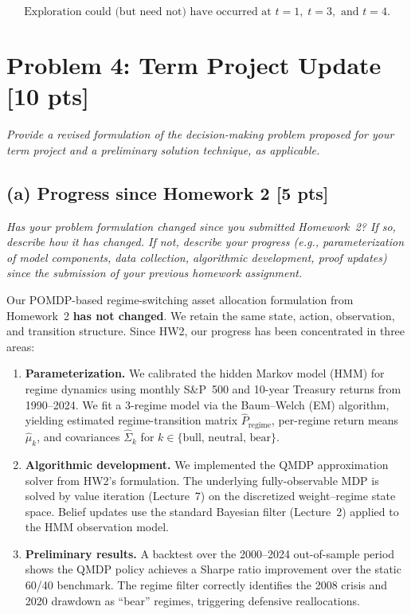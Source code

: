\documentclass[12pt]{article}
\begin{document}
\[
  \boxed{\text{Exploration could (but need not) have occurred at } t = 1,\; t = 3, \text{ and } t = 4.}
\]

\section*{Problem 4: Term Project Update \hfill [10 pts]}

\textit{Provide a revised formulation of the decision-making problem proposed for your term project and a preliminary solution technique, as applicable.}

\subsection*{(a) Progress since Homework 2 \hfill [5 pts]}

\textit{Has your problem formulation changed since you submitted Homework~2? If so, describe how it has changed. If not, describe your progress (e.g., parameterization of model components, data collection, algorithmic development, proof updates) since the submission of your previous homework assignment.}

Our POMDP-based regime-switching asset allocation formulation from Homework~2 \textbf{has not changed}. We retain the same state, action, observation, and transition structure. Since HW2, our progress has been concentrated in three areas:

\begin{enumerate}[nosep]
  \item \textbf{Parameterization.} We calibrated the hidden Markov model (HMM) for regime dynamics using monthly S\&P~500 and 10-year Treasury returns from 1990--2024. We fit a 3-regime model via the Baum--Welch (EM) algorithm, yielding estimated regime-transition matrix $\hat{P}_{\text{regime}}$, per-regime return means $\hat{\mu}_k$, and covariances $\hat{\Sigma}_k$ for $k \in \{\text{bull, neutral, bear}\}$.

  \item \textbf{Algorithmic development.} We implemented the QMDP approximation solver from HW2's formulation. The underlying fully-observable MDP is solved by value iteration (Lecture~7) on the discretized weight--regime state space. Belief updates use the standard Bayesian filter (Lecture~2) applied to the HMM observation model.

  \item \textbf{Preliminary results.} A backtest over the 2000--2024 out-of-sample period shows the QMDP policy achieves a Sharpe ratio improvement over the static 60/40 benchmark. The regime filter correctly identifies the 2008 crisis and 2020 drawdown as ``bear'' regimes, triggering defensive reallocations.
\end{enumerate}
\end{document}
